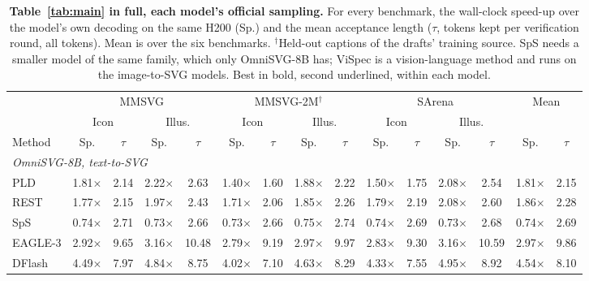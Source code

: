 \begin{table}[t]
\caption{\textbf{Table~\ref{tab:main} in full, each model's official sampling.} For every benchmark, the wall-clock speed-up over the model's own decoding on the same H200 (Sp.) and the mean acceptance length ($\tau$, tokens kept per verification round, all tokens). Mean is over the six benchmarks. $^\dagger$Held-out captions of the drafts' training source. SpS needs a smaller model of the same family, which only OmniSVG-8B has; ViSpec is a vision-language method and runs on the image-to-SVG models. Best in bold, second underlined, within each model.}
\label{app:t1-sample}
\centering
\footnotesize
\setlength{\tabcolsep}{1.5pt}
\begin{tabular*}{\textwidth}{@{\extracolsep{\fill}}l*{14}{c}@{}}
\toprule
 & \multicolumn{4}{c}{MMSVG} & \multicolumn{4}{c}{MMSVG-2M$^\dagger$} & \multicolumn{4}{c}{SArena} & \multicolumn{2}{c}{Mean} \\
\cmidrule(lr){2-5}\cmidrule(lr){6-9}\cmidrule(lr){10-13}\cmidrule(lr){14-15}
 & \multicolumn{2}{c}{Icon} & \multicolumn{2}{c}{Illus.} & \multicolumn{2}{c}{Icon} & \multicolumn{2}{c}{Illus.} & \multicolumn{2}{c}{Icon} & \multicolumn{2}{c}{Illus.} & \multicolumn{2}{c}{} \\
\cmidrule(lr){2-3}\cmidrule(lr){4-5}\cmidrule(lr){6-7}\cmidrule(lr){8-9}\cmidrule(lr){10-11}\cmidrule(lr){12-13}
Method & Sp. & $\tau$ & Sp. & $\tau$ & Sp. & $\tau$ & Sp. & $\tau$ & Sp. & $\tau$ & Sp. & $\tau$ & Sp. & $\tau$ \\
\midrule
\multicolumn{15}{l}{\textit{OmniSVG-8B, text-to-SVG}} \\
PLD & 1.81$\times$ & 2.14 & 2.22$\times$ & 2.63 & 1.40$\times$ & 1.60 & 1.88$\times$ & 2.22 & 1.50$\times$ & 1.75 & 2.08$\times$ & 2.54 & 1.81$\times$ & 2.15 \\
REST & 1.77$\times$ & 2.15 & 1.97$\times$ & 2.43 & 1.71$\times$ & 2.06 & 1.85$\times$ & 2.26 & 1.79$\times$ & 2.19 & 2.08$\times$ & 2.60 & 1.86$\times$ & 2.28 \\
SpS & 0.74$\times$ & 2.71 & 0.73$\times$ & 2.66 & 0.73$\times$ & 2.66 & 0.75$\times$ & 2.74 & 0.74$\times$ & 2.69 & 0.73$\times$ & 2.68 & 0.74$\times$ & 2.69 \\
EAGLE-3 & 2.92$\times$ & 9.65 & 3.16$\times$ & 10.48 & 2.79$\times$ & 9.19 & 2.97$\times$ & 9.97 & 2.83$\times$ & 9.30 & 3.16$\times$ & 10.59 & 2.97$\times$ & 9.86 \\
DFlash & 4.49$\times$ & 7.97 & 4.84$\times$ & 8.75 & 4.02$\times$ & 7.10 & 4.63$\times$ & 8.29 & 4.33$\times$ & 7.55 & 4.95$\times$ & 8.92 & 4.54$\times$ & 8.10 \\

\end{tabular*}
\end{table}
